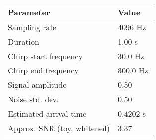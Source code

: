 \begin{tabular}{ll}
\toprule
Parameter & Value \\
\midrule
Sampling rate & 4096 Hz \\
Duration & 1.00 s \\
Chirp start frequency & 30.0 Hz \\
Chirp end frequency & 300.0 Hz \\
Signal amplitude & 0.50 \\
Noise std. dev. & 0.50 \\
Estimated arrival time & 0.4202 s \\
Approx. SNR (toy, whitened) & 3.37 \\
\bottomrule
\end{tabular}
